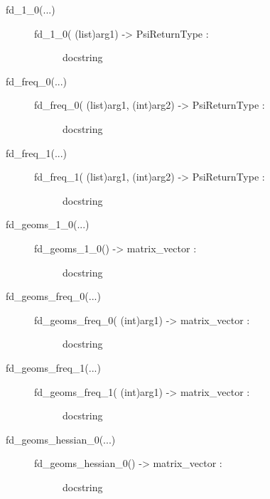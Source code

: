 \documentclass[letterpaper,10pt,english]{sphinxmanual}
\begin{document}
\begin{description}
\begin{description}
\begin{description}
\end{description}

\item[{fd\_1\_0(...)}] \leavevmode\begin{description}
\item[{fd\_1\_0( (list)arg1) -\textgreater{} PsiReturnType :}] \leavevmode
docstring

\end{description}

\item[{fd\_freq\_0(...)}] \leavevmode\begin{description}
\item[{fd\_freq\_0( (list)arg1, (int)arg2) -\textgreater{} PsiReturnType :}] \leavevmode
docstring

\end{description}

\item[{fd\_freq\_1(...)}] \leavevmode\begin{description}
\item[{fd\_freq\_1( (list)arg1, (int)arg2) -\textgreater{} PsiReturnType :}] \leavevmode
docstring

\end{description}

\item[{fd\_geoms\_1\_0(...)}] \leavevmode\begin{description}
\item[{fd\_geoms\_1\_0() -\textgreater{} matrix\_vector :}] \leavevmode
docstring

\end{description}

\item[{fd\_geoms\_freq\_0(...)}] \leavevmode\begin{description}
\item[{fd\_geoms\_freq\_0( (int)arg1) -\textgreater{} matrix\_vector :}] \leavevmode
docstring

\end{description}

\item[{fd\_geoms\_freq\_1(...)}] \leavevmode\begin{description}
\item[{fd\_geoms\_freq\_1( (int)arg1) -\textgreater{} matrix\_vector :}] \leavevmode
docstring

\end{description}

\item[{fd\_geoms\_hessian\_0(...)}] \leavevmode\begin{description}
\item[{fd\_geoms\_hessian\_0() -\textgreater{} matrix\_vector :}] \leavevmode
docstring


\end{description}
\end{description}
\end{description}
\end{document}
